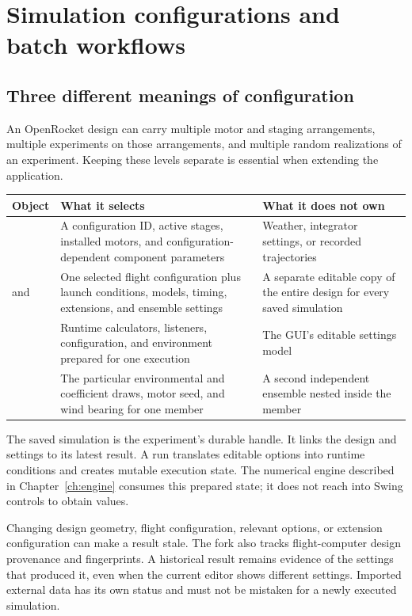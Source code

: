 \chapter{Simulation configurations and batch workflows}\label{ch:workflows}
\section{Three different meanings of configuration}
An OpenRocket design can carry multiple motor and staging arrangements, multiple experiments on those arrangements, and multiple random realizations of an experiment. Keeping these levels separate is essential when extending the application.

\begin{tabularx}{\linewidth}{@{}L{3.5cm}YY@{}}\toprule
Object & What it selects & What it does not own\\\midrule
{} & A configuration ID, active stages, installed motors, and configuration-dependent component parameters & Weather, integrator settings, or recorded trajectories\\
 and  & One selected flight configuration plus launch conditions, models, timing, extensions, and ensemble settings & A separate editable copy of the entire design for every saved simulation\\
 & Runtime calculators, listeners, configuration, and environment prepared for one execution & The GUI's editable settings model\\
 & The particular environmental and coefficient draws, motor seed, and wind bearing for one member & A second independent ensemble nested inside the member\\\bottomrule
\end{tabularx}

The saved simulation is the experiment's durable handle. It links the design and settings to its latest result. A run translates editable options into runtime conditions and creates mutable execution state. The numerical engine described in Chapter~\ref{ch:engine} consumes this prepared state; it does not reach into Swing controls to obtain values.

Changing design geometry, flight configuration, relevant options, or extension configuration can make a result stale. The fork also tracks flight-computer design provenance and fingerprints. A historical result remains evidence of the settings that produced it, even when the current editor shows different settings. Imported external data has its own status and must not be mistaken for a newly executed simulation.

